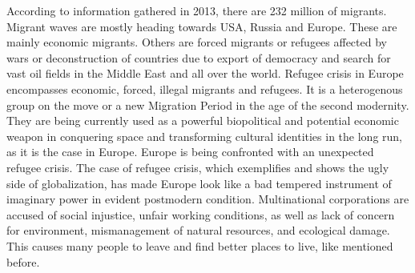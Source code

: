 According to information gathered in 2013, there are 232 million of migrants. Migrant waves are mostly heading towards USA, Russia and Europe. These are mainly economic migrants. Others are forced migrants or refugees affected by wars or deconstruction of countries due to export of democracy and search for vast oil fields in the Middle East and all over the world. Refugee crisis in Europe encompasses economic, forced, illegal migrants and refugees. It is a heterogenous group on the move or a new Migration Period in the age of the second modernity. They are being currently used as a powerful biopolitical and potential economic weapon in conquering space and transforming cultural identities in the long run, as it is the case in Europe. Europe is being confronted with an unexpected refugee crisis. The case of refugee crisis, which exemplifies and shows the ugly side of globalization, has made Europe look like a bad tempered instrument of imaginary power in evident postmodern condition.
Multinational corporations are accused of social injustice, unfair working conditions, as well as lack of concern for environment, mismanagement of natural resources, and ecological damage. This causes many people to leave and find better places to live, like mentioned before.



